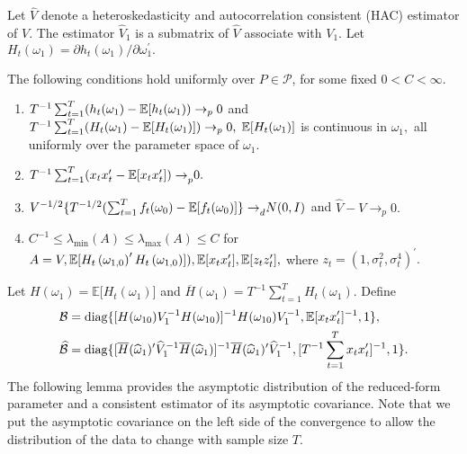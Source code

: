 \documentclass[11pt, letterpaper, twoside]{article}
\begin{document}
Let $\widehat{V}$ denote a heteroskedasticity and autocorrelation consistent (HAC) estimator of $V$. The estimator $\widehat{V}_{1}$ is a submatrix of $\widehat{V}$ associate with $V_{1}.$ Let $H_{t}(\omega _{1})=\partial h_{t}(\omega _{1})/\partial \omega _{1}^{\prime }.$

\begin{assumpR}
    \label{assump:R}
    The following conditions hold uniformly over $P\in \mathcal{P}$, for some fixed $0 < C < \infty$.
    
    \begin{enumerate}
        \item $T^{-1}\sum_{t=1}^{T}(h_{t}(\omega_{1})-\operatorname{\mathbb{E}}[ h_{t}(\omega _{1}))\rightarrow _{p}0$ and $T^{-1}\sum_{t=1}^{T}(H_{t}(\omega _{1})-\operatorname{\mathbb{E}}[H_{t}(\omega _{1})])\rightarrow _{p}0,$ $\operatorname{\mathbb{E}}[H_{t}(\omega _{1})]$ is continuous in $\omega _{1},$ all uniformly over the parameter space of $\omega _{1}$.
        \item $T^{-1}\sum_{t=1}^{T}(x_{t}x_{t}^{\prime }-\operatorname{\mathbb{E}}[ x_{t}x_{t}^{\prime }{])\rightarrow }_{p}0.$
        \item $V^{-1/2}\{T^{-1/2}(\sum_{t=1}^{T}f_{t}(\omega _{0})-\operatorname{\mathbb{E}}[f_{t}(\omega _{0}){]\} \rightarrow }_{d}N(0,I)$ and $\widehat{V} -V\rightarrow _{p}0.$
        \item $C^{-1}\leq \lambda _{\min }(A)\leq \lambda _{\max }(A)\leq C$ for $A=V,\operatorname{\mathbb{E}}[H_{t}\left( \omega _{1,0}\right) ^{\prime }H_{t}\left( \omega _{1,0}\right) ]),\operatorname{\mathbb{E}}[x_{t}x_{t}^{\prime }],\operatorname{\mathbb{E}}[ z_{t}z_{t}^{\prime }],$ where $z_{t}=(1,\sigma _{t}^{2},\sigma _{t}^{4})^{\prime }.$
    \end{enumerate}
\end{assumpR}


Let $H(\omega _{1})=\mathbb{E[}H_{t}(\omega _{1})]$ and $\overline{H}(\omega _{1})=T^{-1}\sum_{t=1}^{T}H_{t}(\omega _{1}).$ Define
%
\begin{align}
%
    \mathcal{B} &= \diag\{[H(\omega _{10})V_{1}^{-1}H(\omega _{10})]^{-1}H(\omega _{10})V_{1}^{-1},\mathbb{E[}x_{t}x_{t}^{\prime }]^{-1},1\},  \notag \\
%
    \widehat{\mathcal{B}} &= \diag\{[\overline{H}(\widehat{\omega }_{1})^{\prime } \widehat{V}_{1}^{-1}\overline{H}(\widehat{\omega }_{1})]^{-1}\overline{H}( \widehat{\omega }_{1})^{\prime }\widehat{V}_{1}^{-1},[T^{-1}
\sum_{t=1}^{T}x_{t}x_{t}^{\prime }]^{-1},1\}.  
%
    \label{Fhat}
\end{align}
%
The following lemma provides the asymptotic distribution of the reduced-form parameter and a consistent estimator of its asymptotic covariance. Note that we put the asymptotic covariance on the left side of the convergence to allow the distribution of the data to change with sample size $T$.
\end{document}
